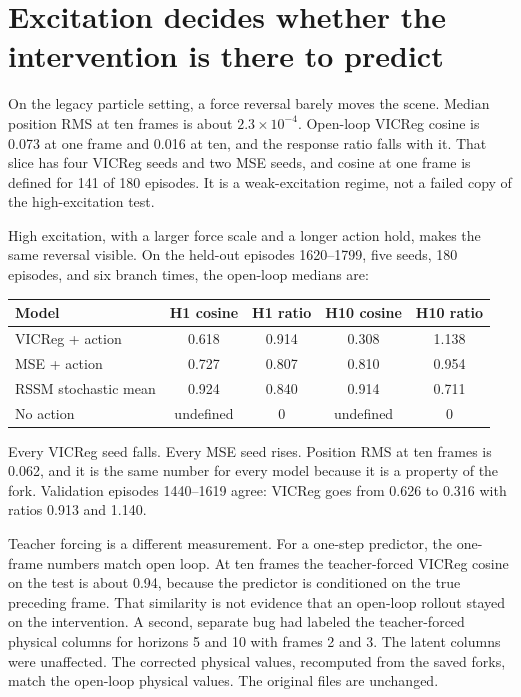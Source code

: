 \documentclass{article}
\begin{document}
\section{Excitation decides whether the intervention is there to predict}

On the legacy particle setting, a force reversal barely moves the scene. Median position RMS at ten frames is about \(2.3\times 10^{-4}\). Open-loop VICReg cosine is 0.073 at one frame and 0.016 at ten, and the response ratio falls with it. That slice has four VICReg seeds and two MSE seeds, and cosine at one frame is defined for 141 of 180 episodes. It is a weak-excitation regime, not a failed copy of the high-excitation test.

High excitation, with a larger force scale and a longer action hold, makes the same reversal visible. On the held-out episodes 1620--1799, five seeds, 180 episodes, and six branch times, the open-loop medians are:

\begin{center}
\begin{tabular}{lcccc}
\toprule
Model & H1 cosine & H1 ratio & H10 cosine & H10 ratio \\
\midrule
VICReg + action & 0.618 & 0.914 & 0.308 & 1.138 \\
MSE + action & 0.727 & 0.807 & 0.810 & 0.954 \\
RSSM stochastic mean & 0.924 & 0.840 & 0.914 & 0.711 \\
No action & undefined & 0 & undefined & 0 \\
\bottomrule
\end{tabular}
\end{center}

Every VICReg seed falls. Every MSE seed rises. Position RMS at ten frames is 0.062, and it is the same number for every model because it is a property of the fork. Validation episodes 1440--1619 agree: VICReg goes from 0.626 to 0.316 with ratios 0.913 and 1.140.

Teacher forcing is a different measurement. For a one-step predictor, the one-frame numbers match open loop. At ten frames the teacher-forced VICReg cosine on the test is about 0.94, because the predictor is conditioned on the true preceding frame. That similarity is not evidence that an open-loop rollout stayed on the intervention. A second, separate bug had labeled the teacher-forced physical columns for horizons 5 and 10 with frames 2 and 3. The latent columns were unaffected. The corrected physical values, recomputed from the saved forks, match the open-loop physical values. The original files are unchanged.
\end{document}
